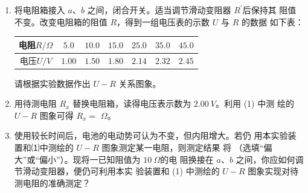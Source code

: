 \begin{enumerate}
\begin{enumerate}
\item
将电阻箱接入 $ a $、$ b $ 之间，闭合开关。适当调节滑动变阻器 $ R ^{\prime} $后保持其
阻值不变。改变电阻箱的阻值 $ R $，得到一组电压表的示数 $ U $ 与 $ R $ 的数据
如下表：
\begin{table}[h!]
\centering 
\begin{tabular}{|c|c|c|c|c|c|c|}
\hline 
电阻$ R/ \Omega $ & $ 5.0 $ & $ 10.0 $ & $ 15.0 $ & $ 25.0 $ & $ 35.0 $ & $ 45.0 $
 \\
\hline
电压$ U/V $ & $ 1.00 $ & $ 1.50 $ & $ 1.80 $ & $ 2.14 $ & $ 2.32 $ & $ 2.45 $\\ 
\hline 
\end{tabular}
\end{table} 
请根据实验数据作出 $ U-R $ 关系图象。
\begin{figure}[h!]
\centering

\end{figure}




\item 
用待测电阻 $ R_{x} $ 替换电阻箱，读得电压表示数为 $ 2.00 \ V $。利用 (1) 中测
绘的 $ U-R $ 图象可得 $ R_{x} =$ \underlinegap $ \Omega $。


\item 
使用较长时间后，电池的电动势可认为不变，但内阻增大。若仍
用本实验装置和⑴中测绘的 $ U-R $ 图象测定某一电阻，则测定结果
将 \underlinegap （选填“偏大”或“偏小”）。现将一已知阻值为 $ 10 \ \Omega $的电
阻换接在 $ a $、$ b $ 之间，你应如何调节滑动变阻器，便仍可利用本实
验装置和 (1) 中测绘的 $ U-R $ 图象实现对待测电阻的准确测定？

\hfullline 


\end{enumerate}





\end{enumerate}
